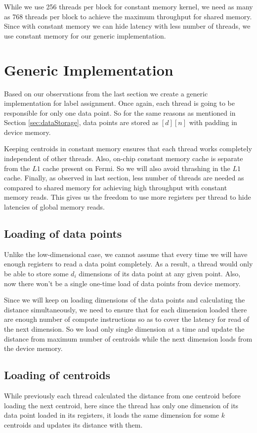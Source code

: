 While we use 256 threads per block for constant memory kernel, we need as many as 768 threads per block to achieve the maximum throughput for shared memory. Since with constant memory we can hide latency with less number of threads, we use constant memory for our generic implementation.

\section{Generic Implementation}
Based on our observations from the last section we create a generic implementation for label assignment. Once again, each thread is going to be responsible for only one data point. So for the same reasons as mentioned in Section \ref{sec:dataStorage}, data points are stored as $[d][n]$ with padding in device memory. 

Keeping centroids in constant memory ensures that each thread works completely independent of other threads. Also, on-chip constant memory cache is separate from the $L1$ cache present on Fermi. So we will also avoid thrashing in the $L1$ cache. Finally, as observed in last section, less number of threads are needed as compared to shared memory for achieving high throughput with constant memory reads. This gives us the freedom to use more registers per thread to hide latencies of global memory reads.

\subsection{Loading of data points}
Unlike the low-dimensional case, we cannot assume that every time we will have enough registers to read a data point completely. As a result, a thread would only be able to store some $d_{i}$ dimensions of its data point at any given point. Also, now there won't be a single one-time load of data points from device memory.

Since we will keep on loading dimensions of the data points and calculating the distance simultaneously, we need to ensure that for each dimension loaded there are enough number of compute instructions so as to cover the latency for read of the next dimension. So we load only single dimension at a time and update the distance from maximum number of centroids while the next dimension loads from the device memory.

\subsection{Loading of centroids}
While previously each thread calculated the distance from one centroid before loading the next centroid, here since the thread has only one dimension of its data point loaded in its registers, it loads the same dimension for some $k$ centroids and updates its distance with them. 


